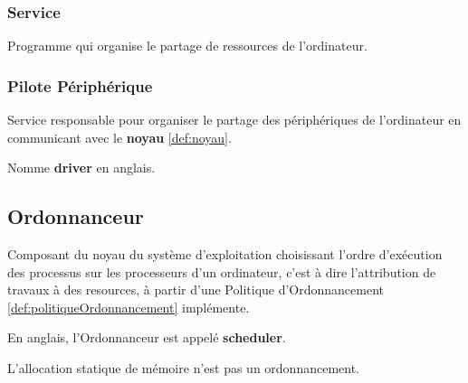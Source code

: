 \documentclass{article}
\begin{document}
\subsubsection{Service}
\begin{definition}\label{def:service}
    Programme qui organise le partage de ressources de l'ordinateur.
\end{definition}

\subsubsection{Pilote Périphérique}
\begin{definition}\label{def:pilotePeripherique}
    Service responsable pour organiser le partage des périphériques de l'ordinateur en communicant avec le \textbf{noyau} \ref{def:noyau}.
    
    \begin{remark}
        Nomme \textbf{driver} en anglais.
    \end{remark}
\end{definition}


\subsection{Ordonnanceur}
\begin{definition}\label{def:ordonnanceur}
    Composant du noyau du système d'exploitation choisissant l'ordre d'exécution des processus sur les processeurs d'un ordinateur, c'est à dire l'attribution de travaux à des resources, à partir d'une Politique d'Ordonnancement \ref{def:politiqueOrdonnancement} implémente.
    
    \begin{remark}
        En anglais, l'Ordonnanceur est appelé \textbf{scheduler}.
    \end{remark}
    L'allocation statique de mémoire n'est pas un ordonnancement.
\end{definition}
\end{document}
